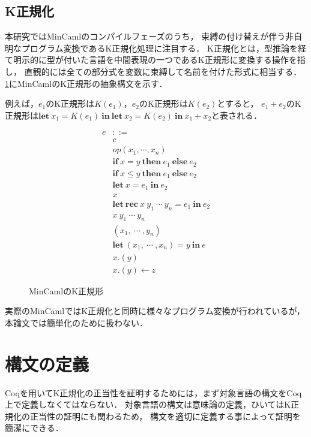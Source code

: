 \documentclass{sumiilab-paper}
\newcommand{\keyword}[1]{\mathbf{#1}}
\newcommand{\IF}{\keyword{if}}
\newcommand{\THEN}{\keyword{then}}
\newcommand{\ELSE}{\keyword{else}}
\newcommand{\LET}{\keyword{let}}
\newcommand{\REC}{\keyword{rec}}
\newcommand{\IN}{\keyword{in}}
\begin{document}
\section{K正規化}
本研究ではMinCamlのコンパイルフェーズのうち，
束縛の付け替えが伴う非自明なプログラム変換であるK正規化処理に注目する．
K正規化とは，型推論を経て明示的に型が付いた言語を中間表現の一つであるK正規形に変換する操作を指し，
直観的には全ての部分式を変数に束縛して名前を付けた形式に相当する．
\figurename\ref{eqn:mincaml-knormal}にMinCamlのK正規形の抽象構文を示す．

例えば，$e_1$のK正規形は$K(e_1)$，$e_2$のK正規形は$K(e_2)$とすると，
$e_1+e_2$のK正規形は$\LET~x_1=K(e_1)~\IN~\LET~x_2=K(e_2)~\IN~x_1+x_2$と表される．

\begin{figure}[htbp]
	\[ \begin{array}{ll}
			e & ::= \\
				& c \\
				& \textit{op}(x_1,\cdots,x_n) \\
				& \IF~x=y~\THEN~e_1~\ELSE~e_2 \\
				& \IF~x \leq y~\THEN~e_1~\ELSE~e_2 \\
			 	& \LET~x=e_1~\IN~e_2 \\
				& x \\
				& \LET~\REC~x~y_1~\cdots~y_n=e_1~\IN~e_2 \\
				& x~y_1~\cdots~y_n \\
				& (x_1,~\cdots~,y_n) \\
				& \LET~(x_1,~\cdots~,x_n)=y~\IN~e \\
				& x.(y) \\
				& x.(y)\leftarrow z
	\end{array} \]
	\caption{MinCamlのK正規形}
	\label{eqn:mincaml-knormal}
\end{figure}

実際のMinCamlではK正規化と同時に様々なプログラム変換が行われているが，
本論文では簡単化のために扱わない．

\chapter{構文の定義}
Coqを用いてK正規化の正当性を証明するためには，まず対象言語の構文をCoq上で定義しなくてはならない．
対象言語の構文は意味論の定義，ひいてはK正規化の正当性の証明にも関わるため，
構文を適切に定義する事によって証明を簡潔にできる．
\end{document}
